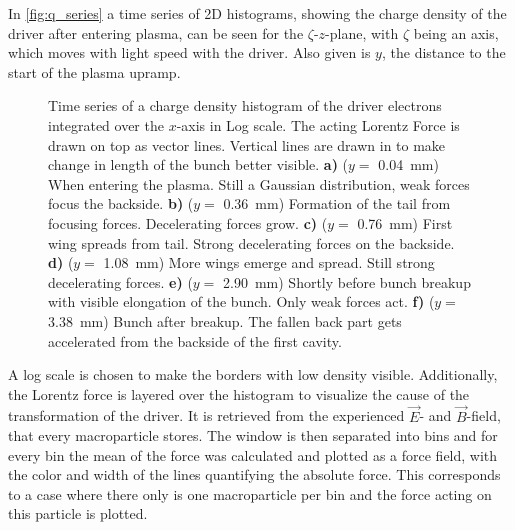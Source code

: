 \documentclass[bachelor_thesis]{subfiles}
\begin{document}
In \autoref{fig:q_series} a time series of 2D histograms, showing the charge density of the driver after entering plasma, can be seen for the $\zeta$-$z$-plane, with $\zeta$ being an axis, which moves with light speed with the driver. Also given is $y$, the distance to the start of the plasma upramp.
\begin{figure}
	\centering
	
	\caption{Time series of a charge density histogram of the driver electrons integrated over the $x$-axis in Log scale. The acting Lorentz Force is drawn on top as vector lines. Vertical lines are drawn in to make change in length of the bunch better visible. 
	\textbf{a)} ($y=$ \qty{0.04}{mm}) When entering the plasma. Still a Gaussian distribution, weak forces focus the backside.
	\textbf{b)} ($y=$ \qty{0.36}{mm}) Formation of the tail from focusing forces. Decelerating forces grow.
	\textbf{c)} ($y=$ \qty{0.76}{mm}) First wing spreads from tail. Strong decelerating forces on the backside.
	\textbf{d)} ($y=$ \qty{1.08}{mm}) More wings emerge and spread. Still strong decelerating forces.
	\textbf{e)} ($y=$ \qty{2.90}{mm}) Shortly before bunch breakup with visible elongation of the bunch. Only weak forces act.
	\textbf{f)} ($y=$ \qty{3.38}{mm}) Bunch after breakup. The fallen back part gets accelerated from the backside of the first cavity.}
	\label{fig:q_series}
\end{figure}
A log scale is chosen to make the borders with low density visible. Additionally, the Lorentz force is layered over the histogram to visualize the cause of the transformation of the driver. It is retrieved from the experienced $\vec{E}$- and $\vec{B}$-field, that every macroparticle stores.
The window is then separated into bins and for every bin the mean of the force was calculated and plotted as a force field, with the color and width of the lines quantifying the absolute force. 
This corresponds to a case where there only is one macroparticle per bin and the force acting on this particle is plotted.
\end{document}
